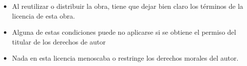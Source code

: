\begin{itemize}
\item Al reutilizar o distribuir la obra, tiene que dejar bien claro los términos de la licencia de esta obra.
\item Alguna de estas condiciones puede no aplicarse si se obtiene el permiso del titular de los derechos de autor
\item Nada en esta licencia menoscaba o restringe los derechos morales del autor.
\end{itemize}